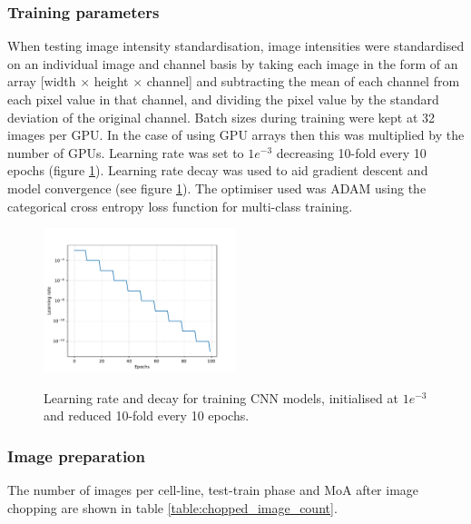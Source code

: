 \documentclass[a4paper,11pt,twoside,openright]{scrbook}
\begin{document}
\subsubsection{Training parameters}

When testing image intensity standardisation, image intensities were standardised on an individual image and channel 
basis by taking each image in the form of an array [width $\times$ height $\times$ channel] and subtracting the mean of 
each channel from each pixel value in that channel, and dividing the pixel value by the standard deviation of the 
original channel.
Batch sizes during training were kept at 32 images per GPU.
In the case of using GPU arrays then this was multiplied by the number of GPUs.
Learning rate was set to $1e^{-3}$ decreasing 10-fold every 10 epochs (figure \ref{figure:learningRate}).
Learning rate decay was used to aid gradient descent and model convergence (see figure \ref{figure:learningRate}).
The optimiser used was ADAM \cite{Kingma2014} using the categorical cross entropy loss function for multi-class 
training.

\begin{figure}
    \captionsetup{width=0.8\textwidth}
    \caption[CNN learning rate and decay]{
Learning rate and decay for training CNN models, initialised at $1e^{-3}$ and reduced 10-fold every 10 epochs.
}
    \includegraphics[width=0.5\textwidth]{ch2learningRate}
    \label{figure:learningRate}
\end{figure}


\subsubsection{Image preparation}

The number of images per cell-line, test-train phase and MoA after image chopping are shown in table 
\ref{table:chopped_image_count}.
\end{document}
